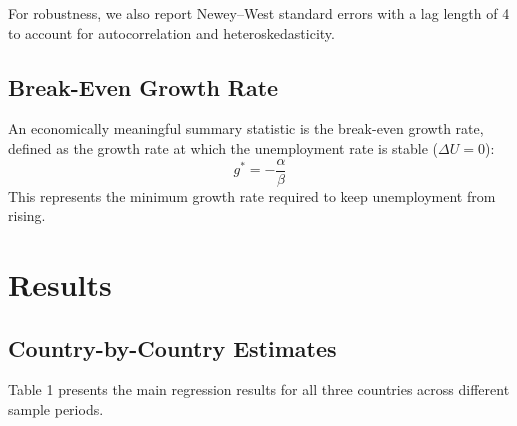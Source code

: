 \documentclass[12pt,a4paper]{article}
\begin{document}
For robustness, we also report Newey--West standard errors with a lag length of 4 to account for autocorrelation and heteroskedasticity.

\subsection{Break-Even Growth Rate}

An economically meaningful summary statistic is the break-even growth rate, defined as the growth rate at which the unemployment rate is stable ($\Delta U = 0$):
\[
g^* = -\frac{\alpha}{\beta}
\]
This represents the minimum growth rate required to keep unemployment from rising.

\section{Results}

\subsection{Country-by-Country Estimates}

Table 1 presents the main regression results for all three countries across different sample periods.
\end{document}
